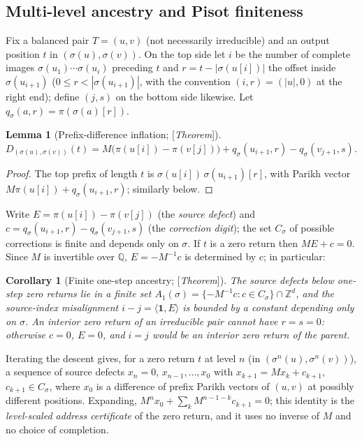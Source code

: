 \documentclass[11pt]{amsart}
\theoremstyle{plain}
\newtheorem{lemma}[theorem]{Lemma}
\newtheorem{corollary}[theorem]{Corollary}
\theoremstyle{definition}
\theoremstyle{remark}
\newcommand{\Z}{\mathbb{Z}}
\newcommand{\Q}{\mathbb{Q}}
\newcommand{\Status}[1]{\textup{[\textit{#1}]}}
\begin{document}
\subsection{Multi-level ancestry and Pisot finiteness}\label{sec:ancestry}

Fix a balanced pair $T=(u,v)$ (not necessarily irreducible) and an output position $t$ in $(\sigma(u),\sigma(v))$. On the top side let $i$ be the number of complete images $\sigma(u_1)\cdots\sigma(u_i)$ preceding $t$ and $r=t-|\sigma(u[i])|$ the offset inside $\sigma(u_{i+1})$ ($0\le r<|\sigma(u_{i+1})|$, with the convention $(i,r)=(|u|,0)$ at the right end); define $(j,s)$ on the bottom side likewise. Let $q_\sigma(a,r)=\pi(\sigma(a)[r])$.

\begin{lemma}[Prefix-difference inflation; \Status{Theorem}]\label{lem:inflation}
$D_{(\sigma(u),\sigma(v))}(t)=M\bigl(\pi(u[i])-\pi(v[j])\bigr)+q_\sigma(u_{i+1},r)-q_\sigma(v_{j+1},s)$.
\end{lemma}
\begin{proof}
The top prefix of length $t$ is $\sigma(u[i])\,\sigma(u_{i+1})[r]$, with Parikh vector $M\pi(u[i])+q_\sigma(u_{i+1},r)$; similarly below.
\end{proof}

Write $E=\pi(u[i])-\pi(v[j])$ (the \emph{source defect}) and $c=q_\sigma(u_{i+1},r)-q_\sigma(v_{j+1},s)$ (the \emph{correction digit}); the set $C_\sigma$ of possible corrections is finite and depends only on $\sigma$. If $t$ is a zero return then $ME+c=0$. Since $M$ is invertible over $\Q$, $E=-M^{-1}c$ is determined by $c$; in particular:

\begin{corollary}[Finite one-step ancestry; \Status{Theorem}]\label{cor:one-step}
The source defects below one-step zero returns lie in a finite set $A_1(\sigma)=\{-M^{-1}c:c\in C_\sigma\}\cap\Z^d$, and the source-index misalignment $i-j=\langle\mathbf 1,E\rangle$ is bounded by a constant depending only on $\sigma$. An interior zero return of an irreducible pair cannot have $r=s=0$: otherwise $c=0$, $E=0$, and $i=j$ would be an interior zero return of the parent.
\end{corollary}

Iterating the descent gives, for a zero return $t$ at level $n$ (in $(\sigma^n(u),\sigma^n(v))$), a sequence of source defects $x_n=0$, $x_{n-1},\dots,x_0$ with $x_{k+1}=Mx_k+c_{k+1}$, $c_{k+1}\in C_\sigma$, where $x_0$ is a difference of prefix Parikh vectors of $(u,v)$ at possibly different positions. Expanding, $M^n x_0+\sum_{k}M^{n-1-k}c_{k+1}=0$; this identity is the \emph{level-scaled address certificate} of the zero return, and it uses no inverse of $M$ and no choice of completion.
\end{document}
